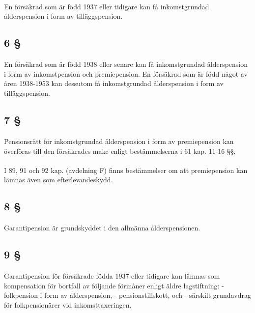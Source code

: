 \documentclass[a4paper,notitlepage,openany,10pt]{book}
\begin{document}
\paragraph*{}
En försäkrad som är född 1937 eller tidigare kan få inkomstgrundad ålderspension i form av tilläggspension.
\subsection*{6 §}
\paragraph*{}
En försäkrad som är född 1938 eller senare kan få inkomstgrundad ålderspension i form av inkomstpension och premiepension. En försäkrad som är född något av åren 1938-1953 kan dessutom få inkomstgrundad ålderspension i form av tilläggspension.
\subsection*{7 §}
\paragraph*{}
Pensionsrätt för inkomstgrundad ålderspension i form av premiepension kan överföras till den försäkrades make enligt bestämmelserna i 61 kap. 11-16 §§.
\paragraph*{}
I 89, 91 och 92 kap. (avdelning F) finns bestämmelser om att premiepension kan lämnas även som efterlevandeskydd.
\subsection*{8 §}
\paragraph*{}
Garantipension är grundskyddet i den allmänna ålderspensionen.
\subsection*{9 §}
\paragraph*{}
Garantipension för försäkrade födda 1937 eller tidigare kan lämnas som kompensation för bortfall av följande förmåner enligt äldre lagstiftning:
\newline - folkpension i form av ålderspension,
\newline - pensionstillskott, och
\newline - särskilt grundavdrag för folkpensionärer vid inkomsttaxeringen.
\end{document}
